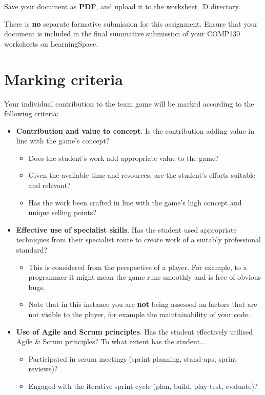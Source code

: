 \documentclass{../../fal_assignment}
\begin{document}
Save your document as \textbf{PDF}, and upload it to the \url{worksheet_D} directory.

There is \textbf{no} separate formative submission for this assignment.
Ensure that your document is included in the final summative submission of your COMP130 worksheets on LearningSpace.

\section*{Marking criteria}

Your individual contribution to the team game will be marked according to the following criteria:
\begin{itemize}
	\item \textbf{Contribution and value to concept}. Is the contribution adding value in line with the game's concept?
		\begin{itemize}
			\item Does the student's work add appropriate value to the game?
			\item Given the available time and resources, are the student's efforts suitable and relevant?
			\item Has the work been crafted in line with the game's high concept and unique selling points?
		\end{itemize}
	\item \textbf{Effective use of specialist skills}. Has the student used appropriate techniques from their specialist route to create work of a suitably professional standard?
		\begin{itemize}
			\item This is considered from the perspective of a player. For example, to a programmer it might mean the game runs smoothly and is free of obvious bugs.
			\item Note that in this instance you are \textbf{not} being assessed on factors that are not visible
to the player, for example the maintainability of your code.
		\end{itemize}
	\item \textbf{Use of Agile and Scrum principles}. Has the student effectively utilised Agile \& Scrum principles?
		To what extent has the student...
		\begin{itemize}
			\item  Participated in scrum meetings (sprint planning, stand-ups, sprint reviews)?
			\item  Engaged with the iterative sprint cycle (plan, build, play-test, evaluate)?

\end{itemize}
\end{itemize}
\end{document}
